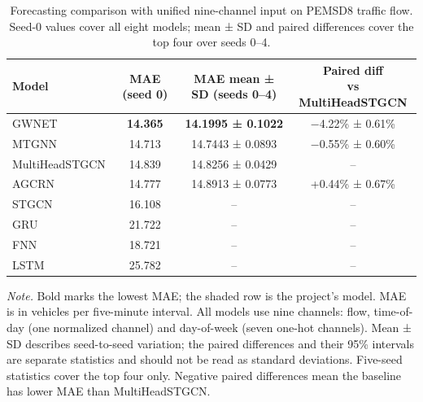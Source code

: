 \begin{table}[htbp]
  \centering
  \small
  \caption{Forecasting comparison with unified nine-channel input on PEMSD8
  traffic flow. Seed-0 values cover all eight models; mean ± SD and paired
  differences cover the top four over seeds 0--4.}
  \label{tab:forecast-unified}
  \begin{tabular}{@{}lccc@{}}
    \toprule
    Model & MAE (seed 0) & MAE mean ± SD (seeds 0--4) & \shortstack{Paired diff\\vs MultiHeadSTGCN} \\
    \midrule
    GWNET                & \textbf{14.365} & \textbf{14.1995 ± 0.1022} & −4.22\% ± 0.61\% \\
    MTGNN                & 14.713 & 14.7443 ± 0.0893 & −0.55\% ± 0.60\% \\
    \rowcolor{oursrow}
    MultiHeadSTGCN & 14.839 & 14.8256 ± 0.0429 & -- \\
    AGCRN                & 14.777 & 14.8913 ± 0.0773 & +0.44\% ± 0.67\% \\
    STGCN                & 16.108 & -- & -- \\
    GRU                  & 21.722 & -- & -- \\
    FNN                  & 18.721 & -- & -- \\
    LSTM                 & 25.782 & -- & -- \\
    \bottomrule
  \end{tabular}
  \par\smallskip
  \begin{minipage}{\linewidth}\footnotesize
    \textit{Note.} Bold marks the lowest MAE; the shaded row is the project's
    model. MAE is in vehicles per five-minute interval. All models use nine
    channels: flow, time-of-day (one normalized channel) and day-of-week (seven
    one-hot channels). Mean ± SD describes seed-to-seed variation; the paired
    differences and their 95\% intervals are separate statistics and should not
    be read as standard deviations. Five-seed statistics cover the top four
    only. Negative paired differences mean the baseline has lower MAE than
    MultiHeadSTGCN.
  \end{minipage}
\end{table}

